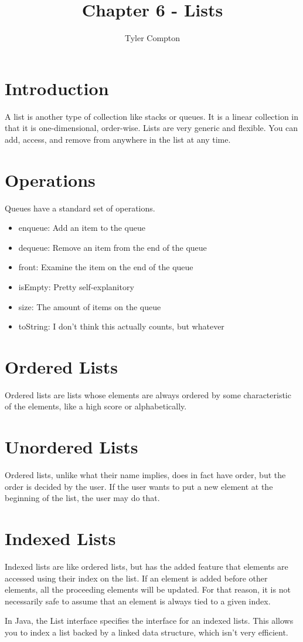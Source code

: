 \documentclass{article}
\author{Tyler Compton}
\title{Chapter 6 - Lists}
\begin{document}
\maketitle
\tableofcontents

\section{Introduction}
A list is another type of collection like stacks or queues. It is a linear
collection in that it is one-dimensional, order-wise. Lists are very generic
and flexible. You can add, access, and remove from anywhere in the list at any
time.

\section{Operations}
Queues have a standard set of operations.

\begin{itemize}
	\item enqueue: Add an item to the queue
	\item dequeue: Remove an item from the end of the queue
	\item front: Examine the item on the end of the queue
	\item isEmpty: Pretty self-explanitory
	\item size: The amount of items on the queue
	\item toString: I don't think this actually counts, but whatever
\end{itemize}

\section{Ordered Lists}
Ordered lists are lists whose elements are always ordered by some
characteristic of the elements, like a high score or alphabetically.

\section{Unordered Lists}
Ordered lists, unlike what their name implies, does in fact have order, but
the order is decided by the user. If the user wants to put a new element at the
beginning of the list, the user may do that.

\section{Indexed Lists}
Indexed lists are like ordered lists, but has the added feature that elements
are accessed using their index on the list. If an element is added before other
elements, all the proceeding elements will be updated. For that reason, it is
not necessarily safe to assume that an element is always tied to a given index.

In Java, the List interface specifies the interface for an indexed lists. This
allows you to index a list backed by a linked data structure, which isn't very
efficient.
\end{document}
